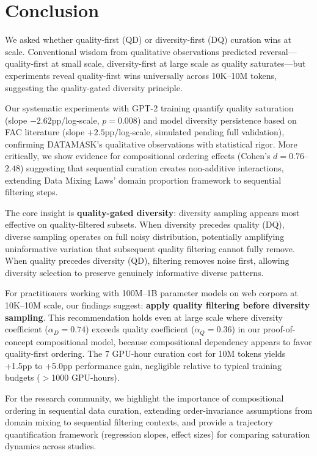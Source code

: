 \section{Conclusion}

We asked whether quality-first (QD) or diversity-first (DQ) curation wins at scale. Conventional wisdom from qualitative observations predicted reversal---quality-first at small scale, diversity-first at large scale as quality saturates---but experiments reveal quality-first wins universally across 10K--10M tokens, suggesting the quality-gated diversity principle.

Our systematic experiments with GPT-2 training quantify quality saturation (slope $-2.62$pp/log-scale, $p=0.008$) and model diversity persistence based on FAC literature (slope $+2.5$pp/log-scale, simulated pending full validation), confirming DATAMASK's qualitative observations with statistical rigor. More critically, we show evidence for compositional ordering effects (Cohen's $d=0.76$--$2.48$) suggesting that sequential curation creates non-additive interactions, extending Data Mixing Laws' domain proportion framework to sequential filtering steps.

The core insight is \textbf{quality-gated diversity}: diversity sampling appears most effective on quality-filtered subsets. When diversity precedes quality (DQ), diverse sampling operates on full noisy distribution, potentially amplifying uninformative variation that subsequent quality filtering cannot fully remove. When quality precedes diversity (QD), filtering removes noise first, allowing diversity selection to preserve genuinely informative diverse patterns.

For practitioners working with 100M--1B parameter models on web corpora at 10K--10M scale, our findings suggest: \textbf{apply quality filtering before diversity sampling}. This recommendation holds even at large scale where diversity coefficient ($\alpha_D=0.74$) exceeds quality coefficient ($\alpha_Q=0.36$) in our proof-of-concept compositional model, because compositional dependency appears to favor quality-first ordering. The 7 GPU-hour curation cost for 10M tokens yields +1.5pp to +5.0pp performance gain, negligible relative to typical training budgets ($>$1000 GPU-hours).

For the research community, we highlight the importance of compositional ordering in sequential data curation, extending order-invariance assumptions from domain mixing to sequential filtering contexts, and provide a trajectory quantification framework (regression slopes, effect sizes) for comparing saturation dynamics across studies.

